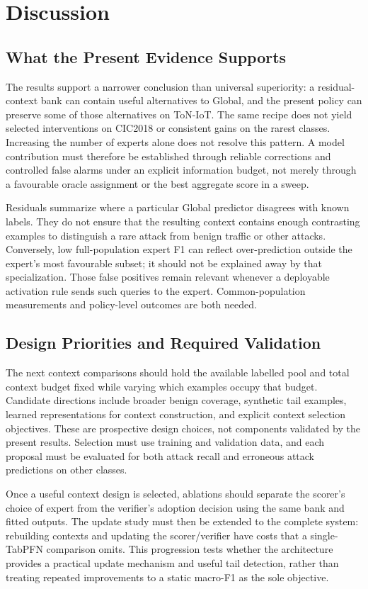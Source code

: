 \documentclass[sigconf,anonymous,pbalance]{acmart}
\begin{document}
\section{Discussion}
\label{sec:discussion}
\subsection{What the Present Evidence Supports}
The results support a narrower conclusion than universal superiority: a residual-context bank can contain useful alternatives to Global, and the present policy can preserve some of those alternatives on ToN-IoT. The same recipe does not yield selected interventions on CIC2018 or consistent gains on the rarest classes. Increasing the number of experts alone does not resolve this pattern. A model contribution must therefore be established through reliable corrections and controlled false alarms under an explicit information budget, not merely through a favourable oracle assignment or the best aggregate score in a sweep.

Residuals summarize where a particular Global predictor disagrees with known labels. They do not ensure that the resulting context contains enough contrasting examples to distinguish a rare attack from benign traffic or other attacks. Conversely, low full-population expert F1 can reflect over-prediction outside the expert's most favourable subset; it should not be explained away by that specialization. Those false positives remain relevant whenever a deployable activation rule sends such queries to the expert. Common-population measurements and policy-level outcomes are both needed.

\subsection{Design Priorities and Required Validation}
The next context comparisons should hold the available labelled pool and total context budget fixed while varying which examples occupy that budget. Candidate directions include broader benign coverage, synthetic tail examples, learned representations for context construction, and explicit context selection objectives. These are prospective design choices, not components validated by the present results. Selection must use training and validation data, and each proposal must be evaluated for both attack recall and erroneous attack predictions on other classes.

Once a useful context design is selected, ablations should separate the scorer's choice of expert from the verifier's adoption decision using the same bank and fitted outputs. The update study must then be extended to the complete system: rebuilding contexts and updating the scorer/verifier have costs that a single-TabPFN comparison omits. This progression tests whether the architecture provides a practical update mechanism and useful tail detection, rather than treating repeated improvements to a static macro-F1 as the sole objective.
\end{document}
